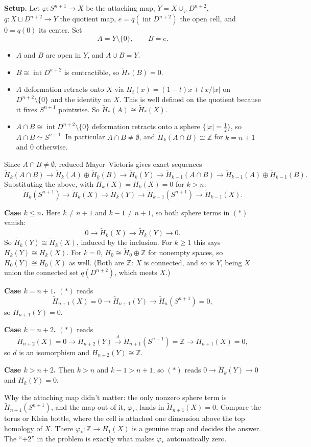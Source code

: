 \documentclass[11pt]{article}
\newcommand{\Z}{\mathbb Z}
\newcommand{\Hred}{\tilde H}
\begin{document}
\textbf{Setup.} Let $\varphi:S^{n+1}\to X$ be the attaching map, $Y=X\cup_\varphi D^{n+2}$, $q:X\sqcup D^{n+2}\to Y$ the quotient map, $e=q(\operatorname{int}D^{n+2})$ the open cell, and $0=q(0)$ its center. Set
\[A=Y\setminus\{0\},\qquad B=e.\]
\begin{itemize}
\item $A$ and $B$ are open in $Y$, and $A\cup B=Y$.
\item $B\cong\operatorname{int}D^{n+2}$ is contractible, so $\Hred_*(B)=0$.
\item $A$ deformation retracts onto $X$ via $H_t(x)=(1-t)x+t\,x/|x|$ on $D^{n+2}\setminus\{0\}$ and the identity on $X$. This is well defined on the quotient because it fixes $S^{n+1}$ pointwise. So $\Hred_*(A)\cong\Hred_*(X)$.
\item $A\cap B\cong\operatorname{int}D^{n+2}\setminus\{0\}$ deformation retracts onto a sphere $\{|x|=\tfrac12\}$, so $A\cap B\simeq S^{n+1}$. In particular $A\cap B\neq\emptyset$, and $\Hred_k(A\cap B)\cong\Z$ for $k=n+1$ and $0$ otherwise.
\end{itemize}
Since $A\cap B\neq\emptyset$, reduced Mayer--Vietoris gives exact sequences
\[\Hred_k(A\cap B)\to\Hred_k(A)\oplus\Hred_k(B)\to\Hred_k(Y)\to\Hred_{k-1}(A\cap B)\to\Hred_{k-1}(A)\oplus\Hred_{k-1}(B).\]
Substituting the above, with $\Hred_k(X)=H_k(X)=0$ for $k>n$:
\[\Hred_k(S^{n+1})\to\Hred_k(X)\to\Hred_k(Y)\to\Hred_{k-1}(S^{n+1})\to\Hred_{k-1}(X).\tag{$*$}\]

\textbf{Case $k\le n$.} Here $k\neq n+1$ and $k-1\neq n+1$, so both sphere terms in $(*)$ vanish:
\[0\to\Hred_k(X)\to\Hred_k(Y)\to0.\]
So $\Hred_k(Y)\cong\Hred_k(X)$, induced by the inclusion. For $k\ge1$ this says $H_k(Y)\cong H_k(X)$. For $k=0$, $H_0\cong\Hred_0\oplus\Z$ for nonempty spaces, so $H_0(Y)\cong H_0(X)$ as well. (Both are $\Z$: $X$ is connected, and so is $Y$, being $X$ union the connected set $q(D^{n+2})$, which meets $X$.)

\textbf{Case $k=n+1$.} $(*)$ reads
\[\Hred_{n+1}(X)=0\to\Hred_{n+1}(Y)\to\Hred_n(S^{n+1})=0,\]
so $H_{n+1}(Y)=0$.

\textbf{Case $k=n+2$.} $(*)$ reads
\[\Hred_{n+2}(X)=0\to\Hred_{n+2}(Y)\xrightarrow{d}\Hred_{n+1}(S^{n+1})=\Z\to\Hred_{n+1}(X)=0,\]
so $d$ is an isomorphism and $H_{n+2}(Y)\cong\Z$.

\textbf{Case $k>n+2$.} Then $k>n$ and $k-1>n+1$, so $(*)$ reads $0\to\Hred_k(Y)\to0$ and $H_k(Y)=0$.

\begin{note}
Why the attaching map didn't matter: the only nonzero sphere term is $\Hred_{n+1}(S^{n+1})$, and the map out of it, $\varphi_*$, lands in $\Hred_{n+1}(X)=0$. Compare the torus or Klein bottle, where the cell is attached one dimension above the top homology of $X$. There $\varphi_*:\Z\to H_1(X)$ is a genuine map and decides the answer. The ``$+2$'' in the problem is exactly what makes $\varphi_*$ automatically zero.
\end{note}
\end{document}
